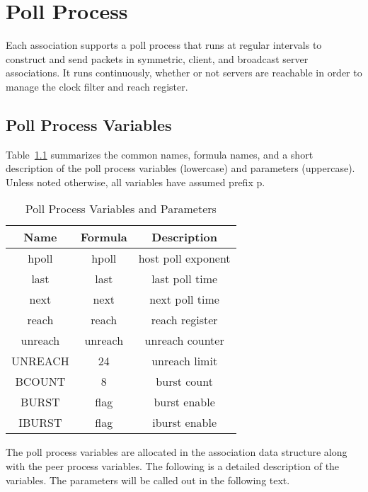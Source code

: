 \chapter{Poll Process}
\label{section-13}

Each association supports a poll process that runs at regular
intervals to construct and send packets in symmetric, client, and
broadcast server associations.  It runs continuously, whether or not
servers are reachable in order to manage the clock filter and reach
register.

\section{Poll Process Variables}
\label{section-13-1}

Table~\ref{poll_process_variables_and_parameters} summarizes the common names, formula names, and a short
description of the poll process variables (lowercase) and parameters
(uppercase).  Unless noted otherwise, all variables have assumed
prefix p.

\begin{table}[htb]
\center
\begin{tabular}{c | c | c}
Name    & Formula & Description        \\
\hline
\hline
hpoll   & hpoll   & host poll exponent \\
last    & last    & last poll time     \\
next    & next    & next poll time     \\
reach   & reach   & reach register     \\
unreach & unreach & unreach counter    \\
UNREACH & 24      & unreach limit      \\
BCOUNT  & 8       & burst count        \\
BURST   & flag    & burst enable       \\
IBURST  & flag    & iburst enable      \\
\hline
\end{tabular}
\label{poll_process_variables_and_parameters}
\caption{Poll Process Variables and Parameters}
\end{table}

The poll process variables are allocated in the association data
structure along with the peer process variables.  The following is a
detailed description of the variables.  The parameters will be called
out in the following text.

